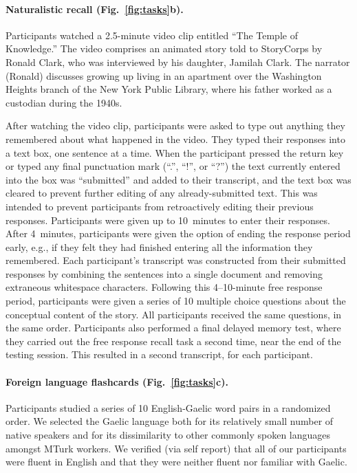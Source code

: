 \documentclass[10pt]{article}
\begin{document}
\paragraph*{Naturalistic recall (Fig.~\ref{fig:tasks}b).}
Participants watched a 2.5-minute video clip entitled ``The Temple of
Knowledge.''  The video comprises an animated story told to StoryCorps
by Ronald Clark, who was interviewed by his daughter, Jamilah Clark.
The narrator (Ronald) discusses growing up living in an apartment over
the Washington Heights branch of the New York Public Library, where his
father worked as a custodian during the 1940s.

After watching the video clip, participants were asked to type out
anything they remembered about what happened in the video.  They typed
their responses into a text box, one sentence at a time.  When the
participant pressed the return key or typed any final punctuation mark
(``.'', ``!'', or ``?'') the text currently entered into the box was
``submitted'' and added to their transcript, and the text box was
cleared to prevent further editing of any already-submitted text.
This was intended to prevent participants from retroactively editing
their previous responses.  Participants were given up to 10~minutes to
enter their responses.  After 4~minutes, participants were given the
option of ending the response period early, e.g., if they felt they
had finished entering all the information they remembered.  Each
participant's transcript was constructed from their submitted
responses by combining the sentences into a single document and
removing extraneous whitespace characters.  Following this 4--10-minute free response period, participants were given a series of 10
multiple choice questions about the conceptual content of the story.
All participants received the same questions, in the same order.
Participants also performed a final delayed memory test, where they
carried out the free response recall task a second time, near the end
of the testing session.  This resulted in a second transcript, for
each participant.

\paragraph*{Foreign language flashcards (Fig.~\ref{fig:tasks}c).}
Participants studied a series of 10 English-Gaelic word pairs in a
randomized order.  We selected the Gaelic language both for its
relatively small number of native speakers and for its dissimilarity
to other commonly spoken languages amongst MTurk workers.
We verified (via self report) that all of our participants were fluent
in English and that they were neither fluent nor familiar with Gaelic.
\end{document}

